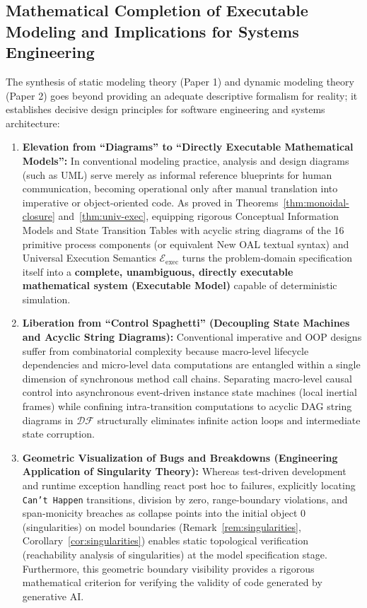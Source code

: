 \documentclass[11pt,a4paper]{article}
\theoremstyle{definition}
\theoremstyle{plain}
\theoremstyle{remark}
\newcommand{\DF}{\mathcal{DF}}
\begin{document}
\subsection{Mathematical Completion of Executable Modeling and Implications for Systems Engineering}
The synthesis of static modeling theory (Paper 1) and dynamic modeling theory (Paper 2) goes beyond providing an adequate descriptive formalism for reality; it establishes decisive design principles for software engineering and systems architecture:
\begin{enumerate}

        \item \textbf{Elevation from ``Diagrams'' to ``Directly Executable Mathematical Models'':} In conventional modeling practice, analysis and design diagrams (such as UML) serve merely as informal reference blueprints for human communication, becoming operational only after manual translation into imperative or object-oriented code. As proved in Theorems~\ref{thm:monoidal-closure} and~\ref{thm:univ-exec}, equipping rigorous Conceptual Information Models and State Transition Tables with acyclic string diagrams of the 16 primitive process components (or equivalent New OAL textual syntax) and Universal Execution Semantics $\mathcal{E}_{\mathrm{exec}}$ turns the problem-domain specification itself into a \textbf{complete, unambiguous, directly executable mathematical system (Executable Model)} capable of deterministic simulation.
    \item \textbf{Liberation from ``Control Spaghetti'' (Decoupling State Machines and Acyclic String Diagrams):} Conventional imperative and OOP designs suffer from combinatorial complexity because macro-level lifecycle dependencies and micro-level data computations are entangled within a single dimension of synchronous method call chains. Separating macro-level causal control into asynchronous event-driven instance state machines (local inertial frames) while confining intra-transition computations to acyclic DAG string diagrams in $\DF$ structurally eliminates infinite action loops and intermediate state corruption.
    \item \textbf{Geometric Visualization of Bugs and Breakdowns (Engineering Application of Singularity Theory):} Whereas test-driven development and runtime exception handling react post hoc to failures, explicitly locating \texttt{Can't Happen} transitions, division by zero, range-boundary violations, and span-monicity breaches as collapse points into the initial object $0$ (singularities) on model boundaries (Remark~\ref{rem:singularities}, Corollary~\ref{cor:singularities}) enables static topological verification (reachability analysis of singularities) at the model specification stage. Furthermore, this geometric boundary visibility provides a rigorous mathematical criterion for verifying the validity of code generated by generative AI.
\end{enumerate}
\end{document}
